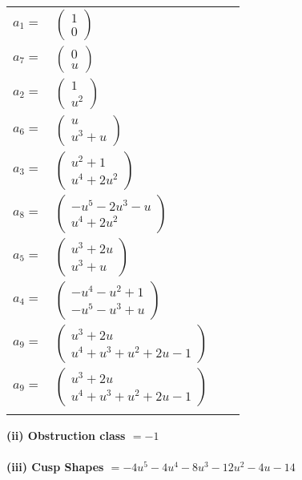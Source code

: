 \documentclass[1p]{elsarticle_modified}
\theoremstyle{definition}
\begin{document}
\begin{tabular}{m{7pt} m{180pt} m{7pt} m{180pt} }
\flushright $a_{1}=$&$\begin{pmatrix}1\\0\end{pmatrix}$ \\
\flushright $a_{7}=$&$\begin{pmatrix}0\\u\end{pmatrix}$ \\
\flushright $a_{2}=$&$\begin{pmatrix}1\\u^2\end{pmatrix}$ \\
\flushright $a_{6}=$&$\begin{pmatrix}u\\u^3+u\end{pmatrix}$ \\
\flushright $a_{3}=$&$\begin{pmatrix}u^2+1\\u^4+2 u^2\end{pmatrix}$ \\
\flushright $a_{8}=$&$\begin{pmatrix}- u^5-2 u^3- u\\u^4+2 u^2\end{pmatrix}$ \\
\flushright $a_{5}=$&$\begin{pmatrix}u^3+2 u\\u^3+u\end{pmatrix}$ \\
\flushright $a_{4}=$&$\begin{pmatrix}- u^4- u^2+1\\- u^5- u^3+u\end{pmatrix}$ \\
\flushright $a_{9}=$&$\begin{pmatrix}u^3+2 u\\u^4+u^3+u^2+2 u-1\end{pmatrix}$\\ \flushright $a_{9}=$&$\begin{pmatrix}u^3+2 u\\u^4+u^3+u^2+2 u-1\end{pmatrix}$\\&\end{tabular}
\flushleft \textbf{(ii) Obstruction class $= -1$}\\~\\
\flushleft \textbf{(iii) Cusp Shapes $= -4 u^5-4 u^4-8 u^3-12 u^2-4 u-14$}\\~\\
\end{document}
